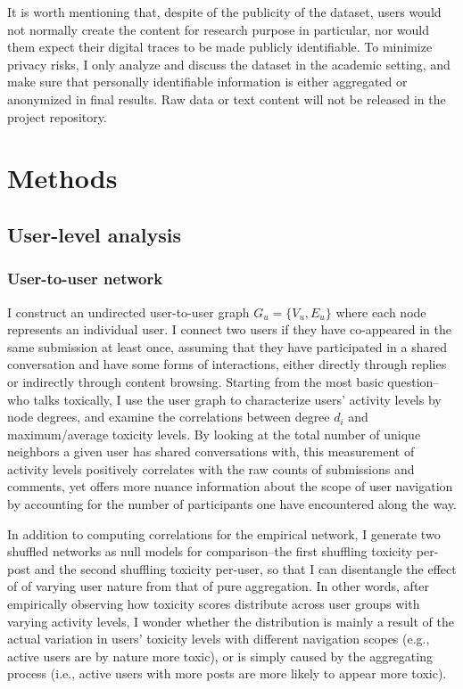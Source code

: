 \documentclass[10pt,twocolumn,letterpaper]{article}
\begin{document}
It is worth mentioning that, despite of the publicity of the dataset, users would not normally create the content for research purpose in particular, nor would them expect their digital traces to be made publicly identifiable. To minimize privacy risks, I only analyze and discuss the dataset in the academic setting, and make sure that personally identifiable information is either aggregated or anonymized in final results. Raw data or text content will not be released in the project repository.

\section{Methods}

\subsection{User-level analysis}

\subsubsection{User-to-user network}

I construct an undirected user-to-user graph $G_u = \{V_u, E_u\}$ where each node represents an individual user. I connect two users if they have co-appeared in the same submission at least once, assuming that they have participated in a shared conversation and have some forms of interactions, either directly through replies or indirectly through content browsing. Starting from the most basic question--who talks toxically, I use the user graph to characterize users' activity levels by node degrees, and examine the correlations between degree $d_i$ and maximum/average toxicity levels. By looking at the total number of unique neighbors a given user has shared conversations with, this measurement of activity levels positively correlates with the raw counts of submissions and comments, yet offers more nuance information about the scope of user navigation by accounting for the number of participants one have encountered along the way.

In addition to computing correlations for the empirical network, I generate two shuffled networks as null models for comparison--the first shuffling toxicity per-post and the second shuffling toxicity per-user, so that I can disentangle the effect of of varying user nature from that of pure aggregation. In other words, after empirically observing how toxicity scores distribute across user groups with varying activity levels, I wonder whether the distribution is mainly a result of the actual variation in users' toxicity levels with different navigation scopes (e.g., active users are by nature more toxic), or is simply caused by the aggregating process (i.e., active users with more posts are more likely to appear more toxic). 
\end{document}
